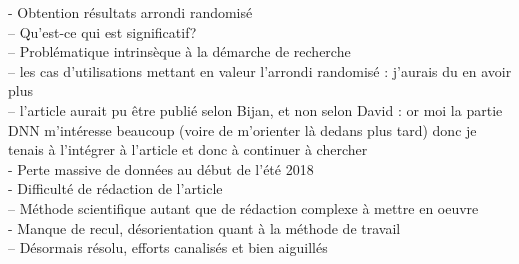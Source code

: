 \documentclass[a4paper,11pt]{article}
\begin{document}

- Obtention résultats arrondi randomisé\\
-- Qu’est-ce qui est significatif? \\
-- Problématique intrinsèque à la démarche de recherche\\
-- les cas d’utilisations mettant en valeur l’arrondi randomisé : j’aurais du en avoir plus\\
-- l’article aurait pu être publié selon Bijan, et non selon David : or moi la partie DNN m’intéresse beaucoup (voire de m’orienter là dedans plus tard) donc je tenais à l’intégrer à l’article et donc à continuer à chercher\\
- Perte massive de données au début de l’été 2018\\
- Difficulté de rédaction de l’article\\
-- Méthode scientifique autant que de rédaction complexe à mettre en oeuvre\\
- Manque de recul, désorientation quant à la méthode de travail\\
-- Désormais résolu, efforts canalisés et bien aiguillés\\
\end{document}
